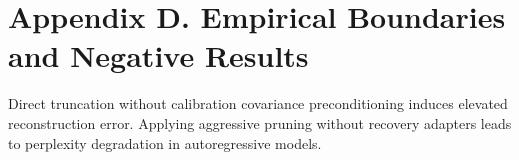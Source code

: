 \section*{Appendix D. Empirical Boundaries and Negative Results}
Direct truncation without calibration covariance preconditioning induces elevated reconstruction error. Applying aggressive pruning without recovery adapters leads to perplexity degradation in autoregressive models.
